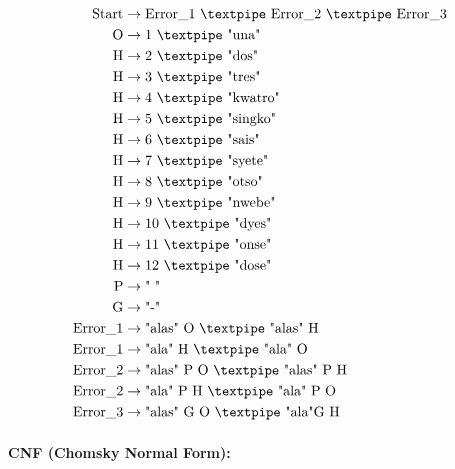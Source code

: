 \begin{equation*}
    \begin{aligned}
        \text{Start}   & \rightarrow \text{Error\_1 {\textpipe} Error\_2 {\textpipe} Error\_3}   \\
        \text{O} & \rightarrow \text{1 {\textpipe} "una"}   \\
        \text{H} & \rightarrow \text{2 {\textpipe} "dos"} \\
        \text{H} & \rightarrow \text{3 {\textpipe} "tres"} \\
        \text{H} & \rightarrow \text{4 {\textpipe} "kwatro"} \\
        \text{H} & \rightarrow \text{5 {\textpipe} "singko"} \\
        \text{H} & \rightarrow \text{6 {\textpipe} "sais"} \\
        \text{H} & \rightarrow \text{7 {\textpipe} "syete"} \\
        \text{H} & \rightarrow \text{8 {\textpipe} "otso"} \\
        \text{H} & \rightarrow \text{9 {\textpipe} "nwebe"} \\
        \text{H} & \rightarrow \text{10 {\textpipe} "dyes"} \\
        \text{H} & \rightarrow \text{11 {\textpipe} "onse"} \\
        \text{H} & \rightarrow \text{12 {\textpipe} "dose"} \\
        \text{P} & \rightarrow \text{" "} \\
        \text{G} & \rightarrow \text{"-"} \\
        \text{Error\_1}   & \rightarrow \text{"alas" O {\textpipe} "alas" H}   \\
        \text{Error\_1}   & \rightarrow \text{"ala" H {\textpipe} "ala" O}   \\
        \text{Error\_2}   & \rightarrow \text{"alas" P O {\textpipe} "alas" P H}   \\
        \text{Error\_2}   & \rightarrow \text{"ala" P H {\textpipe} "ala" P O }   \\
        \text{Error\_3}   & \rightarrow \text{"alas" G O {\textpipe} "ala"G H}
    \end{aligned}
\end{equation*}

\paragraph{CNF (Chomsky Normal Form):}

